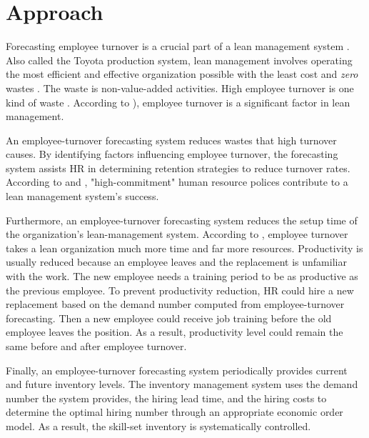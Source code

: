 \section{Approach}
Forecasting employee turnover is a crucial part of a lean management system \citep{allway2002}. Also called the Toyota production system, lean management involves operating the most efficient and effective organization possible with the least cost and {\it zero} wastes \citep{jackson1996}. The waste is non-value-added activities. High employee turnover is one kind of waste \citep{kilpatrick2003}. According to \citet{allway2002} ), employee turnover is a significant factor in lean management. 

An employee-turnover forecasting system reduces wastes that high turnover causes. By identifying factors influencing employee turnover, the forecasting system assists HR in determining retention strategies to reduce turnover rates. According to \citet{yeung1997} and \citet{kochan1992}, "high-commitment" human resource polices contribute to a lean management system's success.

Furthermore, an employee-turnover forecasting system reduces the setup time of the organization's lean-management system. According to \citet{lin1999}, employee turnover takes a lean organization much more time and far more resources. Productivity is usually reduced because an employee leaves and the replacement is unfamiliar with the work. The new employee needs a training period to be as productive as the previous employee. To prevent productivity reduction, HR could hire a new replacement based on the demand number computed from employee-turnover forecasting. Then a new employee could receive job training before the old employee leaves the position. As a result, productivity level could remain the same before and after employee turnover.  

Finally, an employee-turnover forecasting system periodically provides current and future inventory levels. The inventory management system uses the demand number the system provides, the hiring lead time, and the hiring costs to determine the optimal hiring number through an appropriate economic order model. As a result, the skill-set inventory is systematically controlled.


